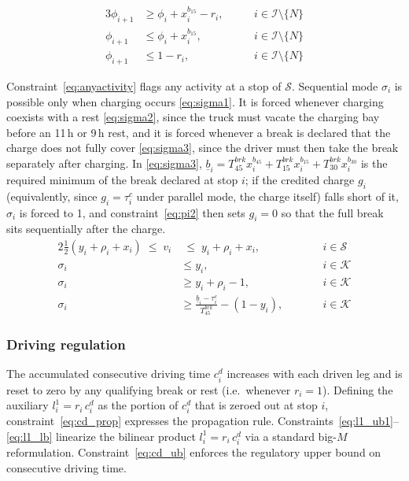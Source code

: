 \documentclass[preprint,12pt,3p]{elsarticle}
\begin{document}
\begin{alignat}{3}
    \phi_{i+1} &\geq \phi_i + x_i^{b_{15}} - r_i,
    &\quad& \, i \in \mathcal{I}\setminus\{N\}
    \label{eq:phi1}\\
    \phi_{i+1} &\leq \phi_i + x_i^{b_{15}},
    &\quad& \, i \in \mathcal{I}\setminus\{N\}
    \label{eq:phi2}\\
    \phi_{i+1} &\leq 1 - r_i,
    &\quad& \, i \in \mathcal{I}\setminus\{N\}
    \label{eq:phi3}
\end{alignat}

Constraint~\eqref{eq:anyactivity} flags any activity at a stop of $\mathcal S$. Sequential mode $\sigma_i$ is possible only when charging occurs \eqref{eq:sigma1}. It is forced whenever charging coexists with a rest \eqref{eq:sigma2}, since the truck must vacate the charging bay before an 11\,h or 9\,h rest, and it is forced whenever a break is declared that the charge does not fully cover \eqref{eq:sigma3}, since the driver must then take the break separately after charging. In \eqref{eq:sigma3}, $\underline b_i = T^{brk}_{45}x^{b_{45}}_i + T^{brk}_{15}x^{b_{15}}_i + T^{brk}_{30}x^{b_{30}}_i$ is the required minimum of the break declared at stop $i$; if the credited charge $g_i$ (equivalently, since $g_i = \tau^c_i$ under parallel mode, the charge itself) falls short of it, $\sigma_i$ is forced to 1, and constraint~\eqref{eq:pi2} then sets $g_i = 0$ so that the full break sits sequentially after the charge.
\begin{alignat}{2}
    \tfrac{1}{2}(y_i + \rho_i + x_i) \;\leq\; v_i &\;\leq\; y_i + \rho_i + x_i,
    &\qquad& i \in \mathcal{S}
    \label{eq:anyactivity}\\
    \sigma_i &\leq y_i, &\qquad& i \in \mathcal{K}
    \label{eq:sigma1}\\
    \sigma_i &\geq y_i + \rho_i - 1, &\qquad& i \in \mathcal{K}
    \label{eq:sigma2}\\
    \sigma_i &\geq \frac{\underline b_i - \tau^c_i}{T^{brk}_{45}} - (1 - y_i), &\qquad& i \in \mathcal{K}
    \label{eq:sigma3}
\end{alignat}




\subsubsection{Driving regulation}

The accumulated consecutive driving time $c_i^d$ increases with each driven leg and is reset to zero by any qualifying break or rest (i.e.\ whenever $r_i = 1$). Defining the auxiliary $l_i^1 = r_i\, c_i^d$ as the portion of $c_i^d$
that is zeroed out at stop $i$, constraint~\eqref{eq:cd_prop} expresses the propagation rule. Constraints~\eqref{eq:l1_ub1}--\eqref{eq:l1_lb} linearize the bilinear product $l_i^1 = r_i\, c_i^d$ via a standard big-$M$ reformulation. Constraint~\eqref{eq:cd_ub} enforces the regulatory upper bound on consecutive driving time.
\end{document}
